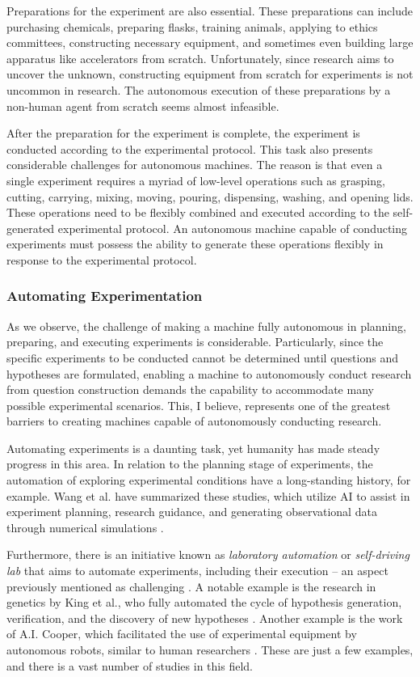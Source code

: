 \documentclass{article}
\begin{document}
Preparations for the experiment are also essential. These preparations can include purchasing chemicals, preparing flasks, training animals, applying to ethics committees, constructing necessary equipment, and sometimes even building large apparatus like accelerators from scratch. Unfortunately, since research aims to uncover the unknown, constructing equipment from scratch for experiments is not uncommon in research. The autonomous execution of these preparations by a non-human agent from scratch seems almost infeasible.

After the preparation for the experiment is complete, the experiment is conducted according to the experimental protocol. This task also presents considerable challenges for autonomous machines. The reason is that even a single experiment requires a myriad of low-level operations such as grasping, cutting, carrying, mixing, moving, pouring, dispensing, washing, and opening lids. These operations need to be flexibly combined and executed according to the self-generated experimental protocol. An autonomous machine capable of conducting experiments must possess the ability to generate these operations flexibly in response to the experimental protocol.

\subsubsection{Automating Experimentation}
As we observe, the challenge of making a machine fully autonomous in planning, preparing, and executing experiments is considerable. Particularly, since the specific experiments to be conducted cannot be determined until questions and hypotheses are formulated, enabling a machine to autonomously conduct research from question construction demands the capability to accommodate many possible experimental scenarios. This, I believe, represents one of the greatest barriers to creating machines capable of autonomously conducting research.

Automating experiments is a daunting task, yet humanity has made steady progress in this area. In relation to the planning stage of experiments, the automation of exploring experimental conditions have a long-standing history, for example. Wang et al. have summarized these studies, which utilize AI to assist in experiment planning, research guidance, and generating observational data through numerical simulations \cite{wang2023scientific}.

Furthermore, there is an initiative known as \textit{laboratory automation} or \textit{self-driving lab} that aims to automate experiments, including their execution – an aspect previously mentioned as challenging \cite{holland2020automation,abolhasani2023rise}. A notable example is the research in genetics by King et al., who fully automated the cycle of hypothesis generation, verification, and the discovery of new hypotheses \cite{king2004functional}. Another example is the work of A.I. Cooper, which facilitated the use of experimental equipment by autonomous robots, similar to human researchers \cite{burger2020mobile}. These are just a few examples, and there is a vast number of studies in this field.
\end{document}
